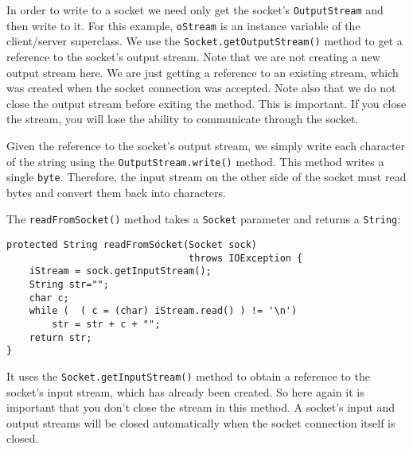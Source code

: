 {In order to write to a socket we need only get the socket's
{\tt OutputStream} and then write to it.  For this example, {\tt oStream} is
an instance variable of the client/server superclass.   We use the
{\tt Socket.getOutputStream()} method to get a reference to the socket's
output stream.  Note that we are not creating a new output stream
here.  We are just getting a reference to an existing stream, which was
created when the socket connection was accepted.   Note also that we do
not close the output stream before exiting the method.   This is
important.  If you close the stream, you will lose the ability to
communicate through the socket.



Given the reference to the socket's output stream, we simply write
each character of the string using the {\tt OutputStream.write()}
method.  This method writes a single {\tt byte}. Therefore, the input
stream on the other side of the socket must read bytes and convert
them back into characters.


\noindent The {\tt readFromSocket()} method takes a {\tt Socket} parameter
and returns a {\tt String}:

\begin{jjjlisting}
\begin{lstlisting}
protected String readFromSocket(Socket sock) 
                                throws IOException {
    iStream = sock.getInputStream();
    String str="";
    char c;
    while (  ( c = (char) iStream.read() ) != '\n')
        str = str + c + "";
    return str;
}
\end{lstlisting}
\end{jjjlisting}


\noindent It uses the {\tt Socket.getInputStream()} method to obtain a
reference to the socket's input stream, which has already been
created.   So here again it is important that you don't close the
stream in this method.  A socket's input and output streams will be
closed automatically when the socket connection itself is closed.

}
